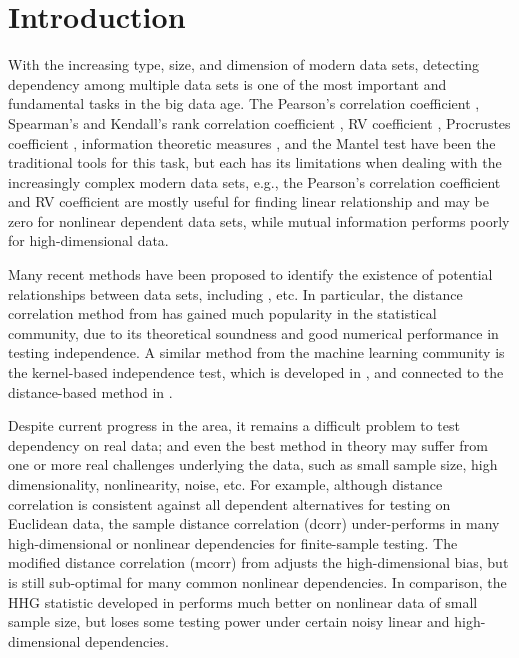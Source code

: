 \documentclass[11pt]{article}
\begin{document}
\newpage
{}

\section{Introduction}
\label{sec:intro}
With the increasing type, size, and dimension of modern data sets, detecting dependency among multiple data sets is one of the most important and fundamental tasks in the big data age. The Pearson's correlation coefficient \cite{Pearson1895}, Spearman's and Kendall's rank correlation coefficient \cite{KendallBook}, RV coefficient \cite{RobertEscoufier1976}, Procrustes coefficient \cite{GowerProcrustesBook}, information theoretic measures \cite{Renyi1959}, and the Mantel test \cite{Mantel1967} have been the traditional tools for this task, but each has its limitations when dealing with the increasingly complex modern data sets, e.g., the Pearson's correlation coefficient and RV coefficient are mostly useful for finding linear relationship and may be zero for nonlinear dependent data sets, while mutual information performs poorly for high-dimensional data. 

Many recent methods have been proposed to identify the existence of potential relationships between data sets, including \cite{Baringhaus2004,TaskinenOjaRandles2005, GrettonEtAl2005, SzekelyRizzoBakirov2007, GrettonGyorfi2010,Reshef2011, HellerGorfine2013, Reimherr2013, SzekelyRizzo2013a, SzekelyRizzo2013b, RizzoSzekely2016}, etc. In particular, the distance correlation method from \cite{SzekelyRizzoBakirov2007, SzekelyRizzo2009, SzekelyRizzo2013a, SzekelyRizzo2014} has gained much popularity in the statistical community, due to its theoretical soundness and good numerical performance in testing independence. A similar method from the machine learning community is the kernel-based independence test, which is developed in \cite{GrettonEtAl2005, GrettonGyorfi2010, GrettonEtAl2012}, and connected to the distance-based method in \cite{SejdinovicEtAl2013}.

Despite  current progress in the area, it remains a difficult problem to test dependency on real data; and even the best method in theory may suffer from one or more real challenges underlying the data, such as small sample size, high dimensionality, nonlinearity, noise, etc. For example, although distance correlation is consistent against all dependent alternatives for testing on Euclidean data, the sample distance correlation (dcorr) under-performs in many high-dimensional or nonlinear dependencies for finite-sample testing. The modified distance correlation (mcorr) from \cite{SzekelyRizzo2013a} adjusts the high-dimensional bias, but is still sub-optimal for many common nonlinear dependencies. In comparison, the HHG statistic developed in \cite{HellerGorfine2013} performs much better on nonlinear data of small sample size, but loses some testing power under certain noisy linear and high-dimensional dependencies.
\end{document}
